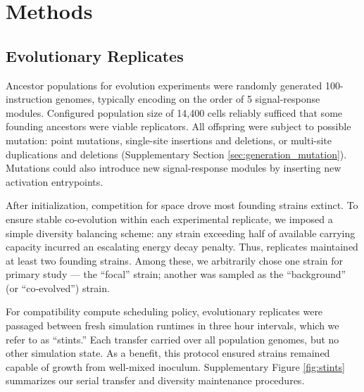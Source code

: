 



\section{Methods} \label{sec:methods}

\subsection{Evolutionary Replicates}

Ancestor populations for evolution experiments were randomly generated 100-instruction genomes, typically encoding on the order of 5 signal-response modules.
Configured population size of 14,400 cells reliably sufficed that some founding ancestors were viable replicators.
All offspring were subject to possible mutation: point mutations, single-site insertions and deletions, or multi-site duplications and deletions (Supplementary Section \ref{sec:generation_mutation}).
Mutations could also introduce new signal-response modules by inserting new activation entrypoints.

After initialization, competition for space drove most founding strains extinct.
To ensure stable co-evolution within each experimental replicate, we imposed a simple diversity balancing scheme: any strain exceeding half of available carrying capacity incurred an escalating energy decay penalty.
Thus, replicates maintained at least two founding strains.
Among these, we arbitrarily chose one strain for primary study --- the ``focal'' strain;
another was sampled as the ``background'' (or ``co-evolved'') strain.

For compatibility compute scheduling policy, evolutionary replicates were passaged between fresh simulation runtimes in three hour intervals, which we refer to as ``stints.''
Each transfer carried over all population genomes, but no other simulation state.
As a benefit, this protocol ensured strains remained capable of growth from well-mixed inoculum.
Supplementary Figure \ref{fig:stints} summarizes our serial transfer and diversity maintenance procedures.


